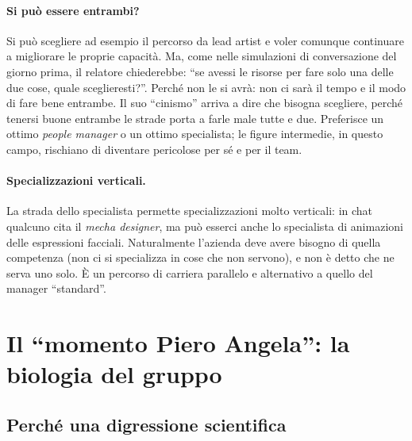 \paragraph{Si può essere entrambi?} Si può scegliere ad esempio il percorso da lead artist
e voler comunque continuare a migliorare le proprie capacità. Ma, come nelle simulazioni di
conversazione del giorno prima, il relatore chiederebbe: ``se avessi le risorse per fare solo
una delle due cose, quale sceglieresti?''. Perché non le si avrà: non ci sarà il tempo e il
modo di fare bene entrambe. Il suo ``cinismo'' arriva a dire che bisogna scegliere, perché
tenersi buone entrambe le strade porta a farle male tutte e due. Preferisce un ottimo
\emph{people manager} o un ottimo specialista; le figure intermedie, in questo campo,
rischiano di diventare pericolose per sé e per il team.

\paragraph{Specializzazioni verticali.} La strada dello specialista permette
specializzazioni molto verticali: in chat qualcuno cita il \emph{mecha designer}, ma può
esserci anche lo specialista di animazioni delle espressioni facciali. Naturalmente l'azienda
deve avere bisogno di quella competenza (non ci si specializza in cose che non servono), e non
è detto che ne serva uno solo. È un percorso di carriera parallelo e alternativo a quello del
manager ``standard''.

\section{Il ``momento Piero Angela'': la biologia del gruppo}
\label{sec:z2-biologia}

\subsection{Perché una digressione scientifica}

